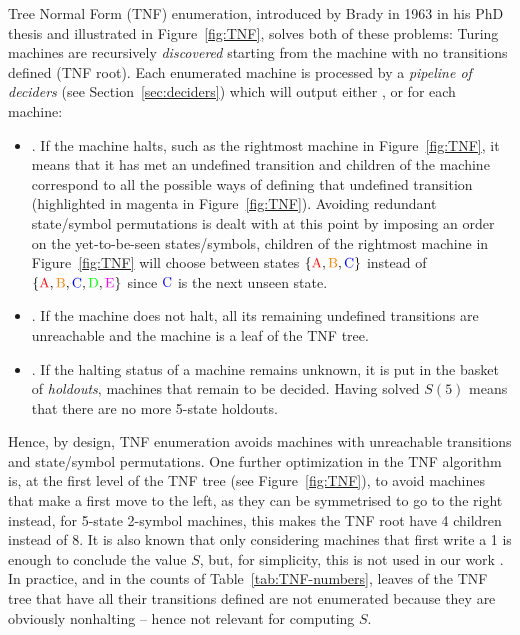 Tree Normal Form (TNF) enumeration, introduced by Brady in 1963 in his PhD thesis \cite{Brady64} and illustrated in Figure~\ref{fig:TNF}, solves both of these problems: Turing machines are recursively \textit{discovered} starting from the machine with no transitions defined (TNF root). Each enumerated machine is processed by a \textit{pipeline of deciders} (see Section~\ref{sec:deciders}) which will output either \HALT, \NONHALT or \UNKNOWN for each machine:
\begin{itemize}
    \item \HALT. If the machine halts, such as the rightmost machine in Figure~\ref{fig:TNF}, it means that it has met an undefined transition and children of the machine correspond to all the possible ways of defining that undefined transition (highlighted in magenta in Figure~\ref{fig:TNF}). Avoiding redundant state/symbol permutations is dealt with at this point by imposing an order on the yet-to-be-seen states/symbols, \eg children of the rightmost machine in Figure~\ref{fig:TNF} will choose between states $\{\text{\stateA},\text{\stateB},\text{\stateC}\}$ instead of $\{\text{\stateA},\text{\stateB},\text{\stateC},\text{\stateD},\text{\stateE}\}$ since $\text{\stateC}$ is the next unseen state.

    \item  \NONHALT. If the machine does not halt, all its remaining undefined transitions are unreachable and the machine is a leaf of the TNF tree.
    \item \UNKNOWN. If the halting status of a machine remains unknown, it is put in the basket of \textit{holdouts}, \ie machines that remain to be decided. Having solved $S(5)$ means that there are no more 5-state holdouts.
\end{itemize}


Hence, by design, TNF enumeration avoids machines with unreachable transitions and state/symbol permutations. One further optimization in the TNF algorithm is,
at the first level of the TNF tree (see Figure~\ref{fig:TNF}), to avoid machines that make a first move to the left, as they can be symmetrised to go to the right instead, \eg for 5-state 2-symbol machines, this makes the TNF root have 4 children instead of 8. It is also known that only considering machines that first write a 1 is enough to conclude the value $S$, but, for simplicity, this is not used in our work \cite{Marxen_1990,busycoq}. In practice, and in the counts of Table~\ref{tab:TNF-numbers}, leaves of the TNF tree that have all their transitions defined are not enumerated because they are obviously nonhalting -- hence not relevant for computing $S$.

